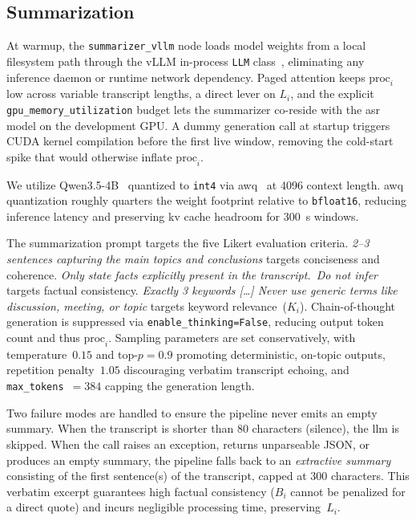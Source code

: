 \documentclass[conference,letterpaper]{IEEEtran}
\begin{document}
\subsection{Summarization}
\label{sec:arch:summ}

At warmup, the \texttt{summarizer\_vllm} node loads model weights from a local filesystem path through the vLLM in-process \texttt{LLM} class~\cite{vllm}, eliminating any inference daemon or runtime network dependency.
Paged attention keeps $\text{proc}_i$ low across variable transcript lengths, a direct lever on $L_i$, and the explicit \texttt{gpu\_memory\_utilization} budget lets the summarizer co-reside with the \gls{asr} model on the development GPU.
A dummy generation call at startup triggers CUDA kernel compilation before the first live window, removing the cold-start spike that would otherwise inflate $\text{proc}_i$.

We utilize Qwen3.5-4B~\cite{qwen3,qwen3-5-4b-awq} quantized to \texttt{int4} via \gls{awq}~\cite{awq} at \num{4096} context length.
\Gls{awq} quantization roughly quarters the weight footprint relative to \texttt{bfloat16}, reducing inference latency and preserving \gls{kv} cache headroom for \SI{300}{\second} windows.

The summarization prompt targets the five Likert evaluation criteria.
\emph{2--3 sentences capturing the main topics and conclusions} targets conciseness and coherence.
\emph{Only state facts explicitly present in the transcript.\ Do not infer} targets factual consistency.
\emph{Exactly 3 keywords [\ldots] Never use generic terms like \textquotesingle discussion\textquotesingle, \textquotesingle meeting\textquotesingle, or \textquotesingle topic\textquotesingle} targets keyword relevance~($K_i$).
Chain-of-thought generation is suppressed via \texttt{enable\_thinking\allowbreak=False}, reducing output token count and thus $\text{proc}_i$.
Sampling parameters are set conservatively, with temperature~$0.15$ and top-$p = 0.9$ promoting deterministic, on-topic outputs, repetition penalty~$1.05$ discouraging verbatim transcript echoing, and \texttt{max\_tokens}~$= 384$ capping the generation length.

Two failure modes are handled to ensure the pipeline never emits an empty summary.
When the transcript is shorter than \num{80} characters (\eg silence), the \gls{llm} is skipped.
When the call raises an exception, returns unparseable JSON, or produces an empty summary, the pipeline falls back to an \emph{extractive summary} consisting of the first sentence(s) of the transcript, capped at \num{300} characters.
This verbatim excerpt guarantees high factual consistency ($B_i$ cannot be penalized for a direct quote) and incurs negligible processing time, preserving~$L_i$.
\end{document}
